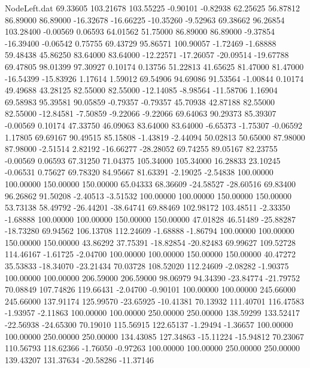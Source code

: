 \begin{filecontents}{NodeLeft.dat}
  69.33605  103.21678  103.55225    -0.90101   -0.82938   62.25625   56.87812   86.89000   86.89000  -16.32678  -16.66225  -10.35260   -9.52963
  69.38662   96.26854  103.28400    -0.00569    0.06593   64.01562   51.75000   86.89000   86.89000   -9.37854  -16.39400   -0.06542    0.75755
  69.43729   95.86571  100.90057    -1.72469   -1.68888   59.48438   45.86250   83.64000   83.64000  -12.22571  -17.26057  -20.09514  -19.67788
  69.47805   98.01399   97.30927     0.10174    0.13756   51.22813   41.65625   81.47000   81.47000  -16.54399  -15.83926    1.17614    1.59012
  69.54906   94.69086   91.53564    -1.00844    0.10174   49.49688   43.28125   82.55000   82.55000  -12.14085   -8.98564  -11.58706    1.16904
  69.58983   95.39581   90.05859    -0.79357   -0.79357   45.70938   42.87188   82.55000   82.55000  -12.84581   -7.50859   -9.22066   -9.22066
  69.64063   90.29373   85.39307    -0.00569    0.10174   47.33750   46.09063   83.64000   83.64000   -6.65373   -1.75307   -0.06592    1.17805
  69.69167   90.49515   85.15808    -1.43819   -2.44094   50.02813   50.65000   87.98000   87.98000   -2.51514    2.82192  -16.66277  -28.28052
  69.74255   89.05167   82.23755    -0.00569    0.06593   67.31250   71.04375  105.34000  105.34000   16.28833   23.10245   -0.06531    0.75627
  69.78320   84.95667   81.63391    -2.19025   -2.54838  100.00000  100.00000  150.00000  150.00000   65.04333   68.36609  -24.58527  -28.60516
  69.83400   96.26862   91.50208    -2.40513   -3.51532  100.00000  100.00000  150.00000  150.00000   53.73138   58.49792  -26.44201  -38.64741
  69.88469  102.98172  103.48511    -2.33350   -1.68888  100.00000  100.00000  150.00000  150.00000   47.01828   46.51489  -25.88287  -18.73280
  69.94562  106.13708  112.24609    -1.68888   -1.86794  100.00000  100.00000  150.00000  150.00000   43.86292   37.75391  -18.82854  -20.82483
  69.99627  109.52728  114.46167    -1.61725   -2.04700  100.00000  100.00000  150.00000  150.00000   40.47272   35.53833  -18.34070  -23.21434
  70.03728  108.52020  112.24609    -2.08282   -1.90375  100.00000  100.00000  206.59000  206.59000   98.06979   94.34390  -23.84774  -21.79752
  70.08849  107.74826  119.66431    -2.04700   -0.90101  100.00000  100.00000  245.66000  245.66000  137.91174  125.99570  -23.65925  -10.41381
  70.13932  111.40701  116.47583    -1.93957   -2.11863  100.00000  100.00000  250.00000  250.00000  138.59299  133.52417  -22.56938  -24.65300
  70.19010  115.56915  122.65137    -1.29494   -1.36657  100.00000  100.00000  250.00000  250.00000  134.43085  127.34863  -15.11224  -15.94812
  70.23067  110.56793  118.62366    -1.76050   -0.97263  100.00000  100.00000  250.00000  250.00000  139.43207  131.37634  -20.58286  -11.37146

\end{filecontents}
